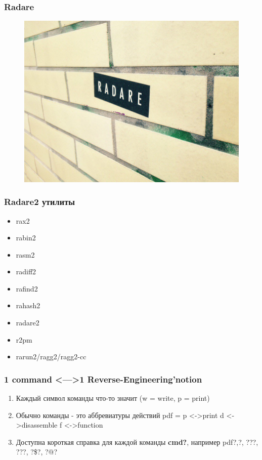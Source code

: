 \documentclass[10pt,pdf,utf8,english,compress,hyperref={unicode}]{beamer}
\begin{document}
\begin{frame}[fragile]
	\frametitle{Radare}
	\begin{figure}
		\includegraphics[scale=0.2]{r2-ubahn.jpg}
	\end{figure}
\end{frame}

\begin{frame}[fragile]
  \frametitle{Radare2 утилиты}
     \begin{itemize}
        \item rax2
        \item rabin2
        \item rasm2
        \item radiff2
        \item rafind2
        \item rahash2
        \item radare2
        \item r2pm
        \item rarun2/ragg2/ragg2-cc
      \end{itemize}
\end{frame}

\begin{frame}[fragile]
  \frametitle{1 command \textless—\textgreater 1 Reverse-Engineering'notion}
  \begin{enumerate}
  \item Каждый символ команды что-то значит \alert{(w = write, p = print)}
  \item Обычно команды - это аббревиатуры действий \alert{pdf = p \textless-\textgreater print d \textless-\textgreater disassemble f \textless-\textgreater function }
  \item Доступна короткая справка для каждой команды \textbf{cmd?}, например \alert{pdf?},\alert{?}, \alert{???}, \alert{???}, \alert{?\$?}, \alert{?@?}
  \end{enumerate}
\end{frame}
\end{document}

